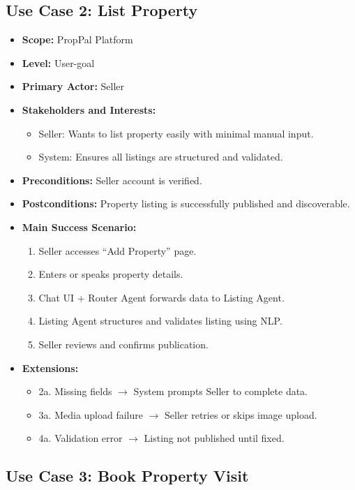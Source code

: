 \subsection{Use Case 2: List Property}

\begin{itemize}
    \item \textbf{Scope:} PropPal Platform
    \item \textbf{Level:} User-goal
    \item \textbf{Primary Actor:} Seller
    \item \textbf{Stakeholders and Interests:}
    \begin{itemize}
        \item Seller: Wants to list property easily with minimal manual input.
        \item System: Ensures all listings are structured and validated.
    \end{itemize}
    \item \textbf{Preconditions:} Seller account is verified.
    \item \textbf{Postconditions:} Property listing is successfully published and discoverable.
    \item \textbf{Main Success Scenario:}
    \begin{enumerate}
        \item Seller accesses ``Add Property'' page.
        \item Enters or speaks property details.
        \item Chat UI + Router Agent forwards data to Listing Agent.
        \item Listing Agent structures and validates listing using NLP.
        \item Seller reviews and confirms publication.
    \end{enumerate}
    \item \textbf{Extensions:}
    \begin{itemize}
        \item 2a. Missing fields $\rightarrow$ System prompts Seller to complete data.
        \item 3a. Media upload failure $\rightarrow$ Seller retries or skips image upload.
        \item 4a. Validation error $\rightarrow$ Listing not published until fixed.
    \end{itemize}
\end{itemize}

\subsection{Use Case 3: Book Property Visit}

